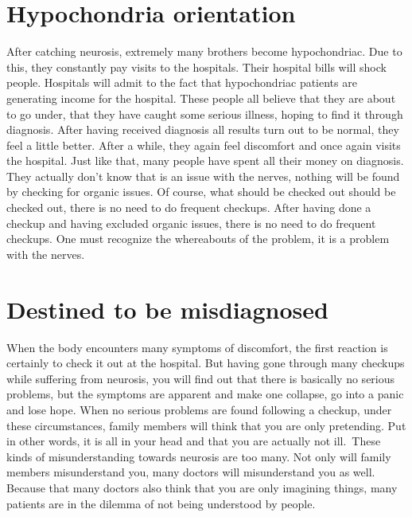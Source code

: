 \documentclass[
]{book}
\begin{document}
\hypertarget{hypochondria-orientation}{%
\section{Hypochondria orientation}\label{hypochondria-orientation}}

After catching neurosis, extremely many brothers become hypochondriac. Due to this, they constantly pay visits to the hospitals. Their hospital bills will shock people. Hospitals will admit to the fact that hypochondriac patients are generating income for the hospital. These people all believe that they are about to go under, that they have caught some serious illness, hoping to find it through diagnosis. After having received diagnosis all results turn out to be normal, they feel a little better. After a while, they again feel discomfort and once again visits the hospital. Just like that, many people have spent all their money on diagnosis. They actually don't know that is an issue with the nerves, nothing will be found by checking for organic issues. Of course, what should be checked out should be checked out, there is no need to do frequent checkups. After having done a checkup and having excluded organic issues, there is no need to do frequent checkups. One must recognize the whereabouts of the problem, it is a problem with the nerves.

\hypertarget{destined-to-be-misdiagnosed}{%
\section{Destined to be misdiagnosed}\label{destined-to-be-misdiagnosed}}

When the body encounters many symptoms of discomfort, the first reaction is certainly to check it out at the hospital. But having gone through many checkups while suffering from neurosis, you will find out that there is basically no serious problems, but the symptoms are apparent and make one collapse, go into a panic and lose hope. When no serious problems are found following a checkup, under these circumstances, family members will think that you are only pretending. Put in other words, it is all in your head and that you are actually not ill.~These kinds of misunderstanding towards neurosis are too many. Not only will family members misunderstand you, many doctors will misunderstand you as well. Because that many doctors also think that you are only imagining things, many patients are in the dilemma of not being understood by people.
\end{document}
